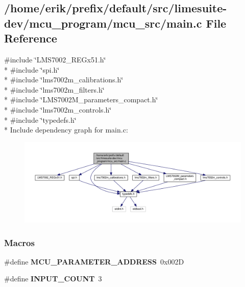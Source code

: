 \subsection{/home/erik/prefix/default/src/limesuite-\/dev/mcu\+\_\+program/mcu\+\_\+src/main.c File Reference}
\label{main_8c}
{\ttfamily \#include \char`\"{}L\+M\+S7002\+\_\+\+R\+E\+Gx51.\+h\char`\"{}}\\*
{\ttfamily \#include \char`\"{}spi.\+h\char`\"{}}\\*
{\ttfamily \#include \char`\"{}lms7002m\+\_\+calibrations.\+h\char`\"{}}\\*
{\ttfamily \#include \char`\"{}lms7002m\+\_\+filters.\+h\char`\"{}}\\*
{\ttfamily \#include \char`\"{}L\+M\+S7002\+M\+\_\+parameters\+\_\+compact.\+h\char`\"{}}\\*
{\ttfamily \#include \char`\"{}lms7002m\+\_\+controls.\+h\char`\"{}}\\*
{\ttfamily \#include \char`\"{}typedefs.\+h\char`\"{}}\\*
Include dependency graph for main.\+c\+:
\nopagebreak
\begin{figure}[H]
\begin{center}
\leavevmode
\includegraphics[width=350pt]{d4/d10/main_8c__incl}
\end{center}
\end{figure}
\subsubsection*{Macros}
\begin{DoxyCompactItemize}
\item 
\#define {\bf M\+C\+U\+\_\+\+P\+A\+R\+A\+M\+E\+T\+E\+R\+\_\+\+A\+D\+D\+R\+E\+SS}~0x002D
\item 
\#define {\bf I\+N\+P\+U\+T\+\_\+\+C\+O\+U\+NT}~3
\end{DoxyCompactItemize}
